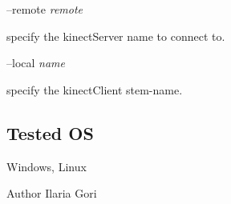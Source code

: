 --remote {\itshape remote} 
\begin{DoxyItemize}
\item specify the kinect\+Server name to connect to.
\end{DoxyItemize}

--local {\itshape name} 
\begin{DoxyItemize}
\item specify the kinect\+Client stem-\/name.
\end{DoxyItemize}\hypertarget{group__kinectServer_tested_os_sec}{}\subsection{Tested O\+S}\label{group__kinectServer_tested_os_sec}
Windows, Linux

\begin{DoxyAuthor}{Author}
Ilaria Gori 
\end{DoxyAuthor}
